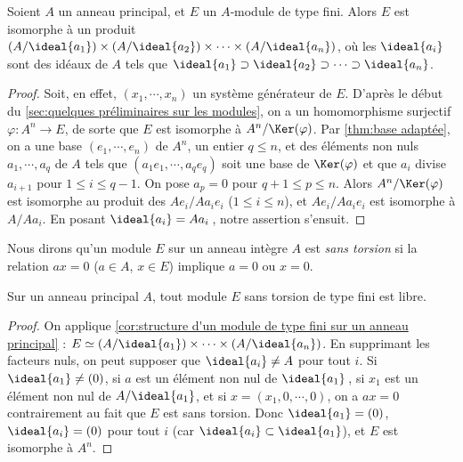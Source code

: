 \documentclass[11pt, %
  title in boldface,
  theorem in new line,
  theorem numbering = section,
  number theorems separately,
  simple name,
]{beaulivre}
\begin{document}
    \begin{corollary}\label{cor:structure d'un module de type fini sur un anneau principal}
        Soient \( A \) un anneau principal, et \( E \) un \( A \)‑module de type fini. Alors \( E \) est isomorphe à un produit \( (A/\ideal{a_1}) \times (A/\ideal{a_2}) \times \cdots \times (A/\ideal{a_n}) \), où les \( \ideal{a_i} \) sont des idéaux de \( A \) tels que \( \ideal{a_1} \supset \ideal{a_2} \supset \cdots \supset \ideal{a_n} \).
    \end{corollary}
    \begin{proof}
        Soit, en effet, \( (x_1, \cdots, x_n) \) un système générateur de \( E \). D'après le début du \cref{sec:quelques préliminaires sur les modules}, on a un homomorphisme surjectif \( \varphi \colon A^n \to E \), de sorte que \( E \) est isomorphe à \( A^n/\Ker(\varphi) \). Par \cref{thm:base adaptée}, on a une base \( (e_1, \cdots, e_n) \) de \( A^n \), un entier \( q \leqslant n \), et des éléments non nuls \( a_1, \cdots, a_q \) de \( A \) tels que \( (a_1 e_1, \cdots, a_q e_q) \) soit une base de \( \Ker(\varphi) \) et que \( a_i \) divise \( a_{i+1} \) pour \( 1 \leqslant i \leqslant q-1 \). On pose \( a_p = 0 \) pour \( q+1 \leqslant p \leqslant n \). Alors \( A^n/\Ker(\varphi) \) est isomorphe au produit des \( A e_i / A a_i e_i \) (\( 1 \leqslant i \leqslant n \)), et \( A e_i / A a_i e_i \) est isomorphe à \( A / A a_i \). En posant \( \ideal{a_i} = A a_i \)\,, notre assertion s'ensuit.
    \end{proof}

    Nous dirons qu'un module \( E \) sur un anneau intègre \( A \) est \emph{sans torsion} si la relation \( ax=0 \) (\( a \in A \), \( x \in E \)) implique \( a = 0 \) ou \( x = 0 \).

    \begin{corollary}
        Sur un anneau principal \( A \), tout module \( E \) sans torsion de type fini est libre.
    \end{corollary}
    \begin{proof}
        On applique \cref{cor:structure d'un module de type fini sur un anneau principal} : \( E \simeq (A/\ideal{a_1}) \times \cdots \times (A/\ideal{a_n}) \). En supprimant les facteurs nuls, on peut supposer que \( \ideal{a_i} \neq A \) pour tout \( i \). Si \( \ideal{a_1} \neq (0) \), si \( a \) est un élément non nul de \( \ideal{a_1} \)\,, si \( x_1 \) est un élément non nul de \( A/\ideal{a_1} \), et si \( x = (x_1, 0, \cdots, 0) \), on a \( ax = 0 \) contrairement au fait que \( E \) est sans torsion. Donc \( \ideal{a_1} = (0) \), \( \ideal{a_i} = (0) \) pour tout \( i \) (car \( \ideal{a_i} \subset \ideal{a_1} \)), et \( E \) est isomorphe à \( A^n \).
    \end{proof}
\end{document}

